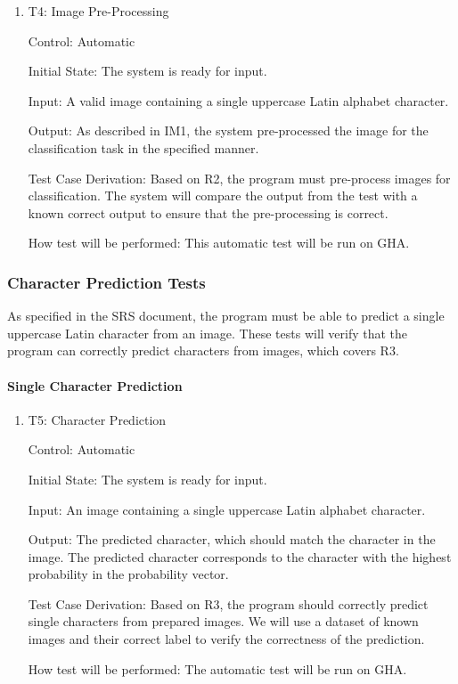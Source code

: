 \documentclass[12pt, titlepage]{article}
\begin{document}
\begin{enumerate}

\item{T4: Image Pre-Processing\\}

Control: Automatic

Initial State: The \progname{} system is ready for input.

Input: A valid image containing a single uppercase Latin alphabet character.

Output: As described in IM1, the system pre-processed the image for the
classification task in the specified manner.

Test Case Derivation: Based on R2, the program must pre-process images for
classification. The system will compare the output from the test with a known
correct output to ensure that the pre-processing is correct.

How test will be performed: This automatic test will be run on GHA.

\end{enumerate}

\subsubsection{Character Prediction Tests}

As specified in the SRS document, the program must be able to predict a single
uppercase Latin character from an image. These tests will verify that the program
can correctly predict characters from images, which covers R3.

\paragraph{Single Character Prediction}

\begin{enumerate}

\item{T5: Character Prediction\\}

Control: Automatic

Initial State: The \progname{} system is ready for input.

Input: An image containing a single uppercase Latin alphabet character.

Output: The predicted character, which should match the character in the image.
The predicted character corresponds to the character with the highest
probability in the probability vector.

Test Case Derivation: Based on R3, the program should correctly predict single
characters from prepared images. We will use a dataset of known images and their
correct label to verify the correctness of the prediction.

How test will be performed: The automatic test will be run on GHA.

\end{enumerate}
\end{document}

